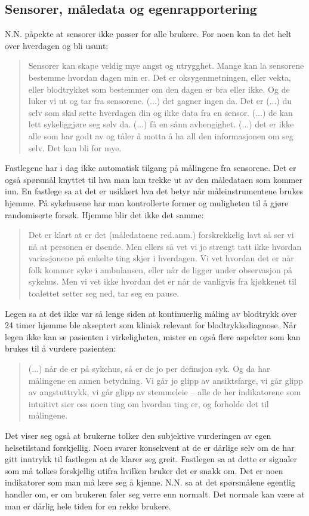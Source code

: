 \subsection{Sensorer, måledata og egenrapportering}
N.N. påpekte at sensorer ikke passer for alle brukere. For noen kan ta det helt over hverdagen og bli usunt:

\blockquote{Sensorer kan skape veldig mye angst og utrygghet. Mange kan la sensorene bestemme hvordan dagen min er. Det er oksygenmetningen,
    eller vekta, eller blodtrykket som bestemmer om den dagen er bra eller ikke. Og de luker vi ut og tar fra sensorene. (...) det
    gagner ingen da. Det er (...) du selv som skal sette hverdagen din og ikke data fra en sensor.
    (...) de kan lett sykeliggjøre seg selv da. (...) få en sånn avhengighet. (...) det er ikke alle som har godt av og tåler å motta å ha
    all den informasjonen om seg selv. Det kan bli for mye.}

Fastlegene har i dag ikke automatisk tilgang på målingene fra sensorene. Det er også spørsmål knyttet til hva man kan trekke ut av den
måledataen som kommer inn. En fastlege sa at det er usikkert hva det betyr når måleinstrumentene brukes hjemme. På sykehusene har man
kontrollerte former og muligheten til å gjøre randomiserte forsøk. Hjemme blir det ikke det samme:

\blockquote{Det er klart at er det (måledataene red.anm.) forskrekkelig lavt så ser vi nå at personen er døende. Men ellers så vet vi jo strengt tatt ikke
    hvordan variasjonene på enkelte ting
    skjer i hverdagen. Vi vet hvordan det er når folk kommer syke i ambulansen, eller når de ligger under observasjon på sykehus.
    Men vi vet ikke hvordan det er når de vanligvis fra kjøkkenet til toalettet setter seg ned, tar seg en pause.}

Legen sa at det ikke var så lenge siden at kontinuerlig måling av blodtrykk over 24 timer hjemme ble akseptert som klinisk relevant
for blodtrykksdiagnose. Når legen ikke kan se pasienten i virkeligheten, mister en også flere aspekter som kan brukes til å vurdere
pasienten: \blockquote{
    (...) når de er på sykehus, så er de jo per definsjon syk. Og da har målingene en annen betydning. Vi går jo glipp av ansiktsfarge,
    vi går glipp av angstuttrykk, vi går glipp
av stemmeleie -- alle de her indikatorene som intuitivt sier oss noen ting om hvordan ting er, og forholde det til målingene.}

Det viser seg også at brukerne tolker den subjektive vurderingen av egen helsetilstand forskjellig. Noen svarer konsekvent at de er dårlige
selv om de har gitt inntrykk til fastlegen at de klarer seg greit. Fastlegen sa at dette er signaler som må tolkes forskjellig utifra hvilken
bruker det er snakk om. Det er noen indikatorer som man må lære seg å kjenne. N.N. sa at det spørsmålene egentlig handler om, er om
brukeren føler seg verre enn normalt. Det normale kan være at man er dårlig hele tiden for en rekke brukere.

